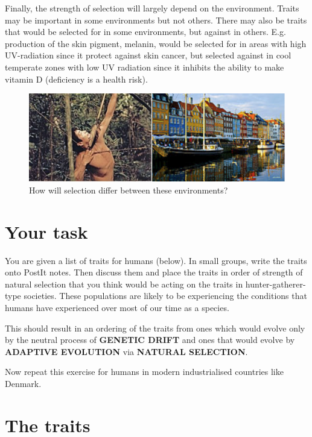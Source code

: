 \documentclass[
  a4paper]{book}
\begin{document}
Finally, the strength of selection will largely depend on the
environment. Traits may be important in some environments but not
others. There may also be traits that would be selected for in some
environments, but against in others. E.g. production of the skin
pigment, melanin, would be selected for in areas with high UV-radiation
since it protect against skin cancer, but selected against in cool
temperate zones with low UV radiation since it inhibits the ability to
make vitamin D (deficiency is a health risk).

\begin{figure}

{\centering \includegraphics[width=0.5\linewidth]{images/huntergathererDK} 

}

\caption{How will selection differ between these environments?}\label{fig:huntergatherer}
\end{figure}

\hypertarget{your-task}{%
\section{Your task}\label{your-task}}

You are given a list of traits for humans (below). In small groups,
write the traits onto PostIt notes. Then discuss them and place the
traits in order of strength of natural selection that you think would be
acting on the traits in hunter-gatherer-type societies. These
populations are likely to be experiencing the conditions that humans
have experienced over most of our time as a species.

This should result in an ordering of the traits from ones which would
evolve only by the neutral process of \textbf{GENETIC DRIFT} and ones
that would evolve by \textbf{ADAPTIVE EVOLUTION} via \textbf{NATURAL
SELECTION}.

Now repeat this exercise for humans in modern industrialised countries
like Denmark.

\hypertarget{the-traits}{%
\section{The traits}\label{the-traits}}
\end{document}
